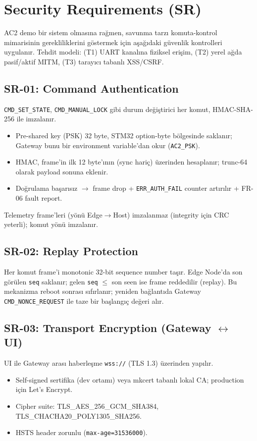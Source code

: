\section{Security Requirements (SR)}

AC2 demo bir sistem olmasına rağmen, savunma tarzı komuta-kontrol mimarisinin gerekliliklerini göstermek için aşağıdaki güvenlik kontrolleri uygulanır. Tehdit modeli: (T1) UART kanalına fiziksel erişim, (T2) yerel ağda pasif/aktif MITM, (T3) tarayıcı tabanlı XSS/CSRF.

\subsection{SR-01: Command Authentication}
\texttt{CMD\_SET\_STATE}, \texttt{CMD\_MANUAL\_LOCK} gibi durum değiştirici her komut, HMAC-SHA-256 ile imzalanır.
\begin{itemize}
    \item Pre-shared key (PSK) 32 byte, STM32 option-byte bölgesinde saklanır; Gateway bunu bir environment variable'dan okur (\texttt{AC2\_PSK}).
    \item HMAC, frame'in ilk 12 byte'ının (sync hariç) üzerinden hesaplanır; trunc-64 olarak payload sonuna eklenir.
    \item Doğrulama başarısız $\rightarrow$ frame drop + \texttt{ERR\_AUTH\_FAIL} counter artırılır + FR-06 fault report.
\end{itemize}
\noindent Telemetry frame'leri (yönü Edge$\rightarrow$Host) imzalanmaz (integrity için CRC yeterli); komut yönü imzalanır.

\subsection{SR-02: Replay Protection}
Her komut frame'i monotonic 32-bit sequence number taşır. Edge Node'da son görülen \texttt{seq} saklanır; gelen \texttt{seq} $\leq$ son seen ise frame reddedilir (replay). Bu mekanizma reboot sonrası sıfırlanır; yeniden bağlantıda Gateway \texttt{CMD\_NONCE\_REQUEST} ile taze bir başlangıç değeri alır.

\subsection{SR-03: Transport Encryption (Gateway $\leftrightarrow$ UI)}
UI ile Gateway arası haberleşme \texttt{wss://} (TLS 1.3) üzerinden yapılır.
\begin{itemize}
    \item Self-signed sertifika (dev ortamı) veya mkcert tabanlı lokal CA; production için Let's Encrypt.
    \item Cipher suite: TLS\_AES\_256\_GCM\_SHA384, TLS\_CHACHA20\_POLY1305\_SHA256.
    \item HSTS header zorunlu (\texttt{max-age=31536000}).
\end{itemize}

